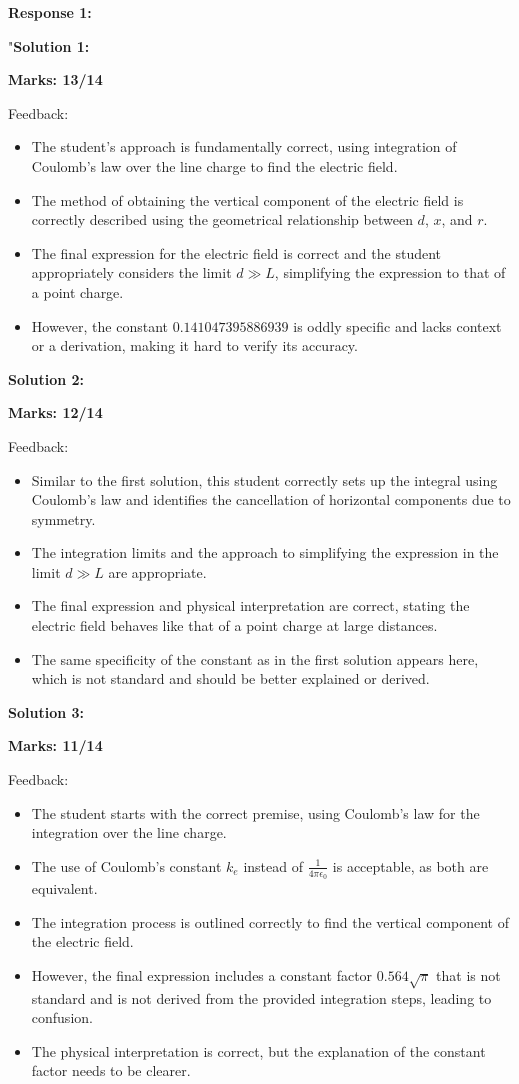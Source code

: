 \documentclass[a4paper,11pt]{article}
\begin{document}
\textbf{Response 1:}

"\textbf{Solution 1:}

\textbf{Marks: 13/14}

Feedback:
\begin{itemize}
  \item The student's approach is fundamentally correct, using integration of Coulomb's law over the line charge to find the electric field.
  \item The method of obtaining the vertical component of the electric field is correctly described using the geometrical relationship between \( d \), \( x \), and \( r \).
  \item The final expression for the electric field is correct and the student appropriately considers the limit \( d \gg L \), simplifying the expression to that of a point charge.
  \item However, the constant \( 0.141047395886939 \) is oddly specific and lacks context or a derivation, making it hard to verify its accuracy.
\end{itemize}

\textbf{Solution 2:}

\textbf{Marks: 12/14}

Feedback:
\begin{itemize}
  \item Similar to the first solution, this student correctly sets up the integral using Coulomb's law and identifies the cancellation of horizontal components due to symmetry.
  \item The integration limits and the approach to simplifying the expression in the limit \( d \gg L \) are appropriate.
  \item The final expression and physical interpretation are correct, stating the electric field behaves like that of a point charge at large distances.
  \item The same specificity of the constant as in the first solution appears here, which is not standard and should be better explained or derived.
\end{itemize}

\textbf{Solution 3:}

\textbf{Marks: 11/14}

Feedback:
\begin{itemize}
  \item The student starts with the correct premise, using Coulomb's law for the integration over the line charge.
  \item The use of Coulomb's constant \( k_e \) instead of \( \frac{1}{4\pi\epsilon_0} \) is acceptable, as both are equivalent.
  \item The integration process is outlined correctly to find the vertical component of the electric field.
  \item However, the final expression includes a constant factor \( 0.564 \sqrt{\pi} \) that is not standard and is not derived from the provided integration steps, leading to confusion.
  \item The physical interpretation is correct, but the explanation of the constant factor needs to be clearer.
\end{itemize}
\end{document}
